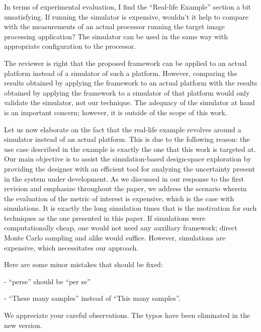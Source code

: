 \begin{reviewer}
In terms of experimental evaluation, I find the ``Real-life Example'' section a
bit unsatisfying. If running the simulator is expensive, wouldn't it help to
compare with the measurements of an actual processor running the target image
processing application? The simulator can be used in the same way with
appropriate configuration to the processor.
\end{reviewer}

\begin{authors}
The reviewer is right that the proposed framework can be applied to an actual
platform instead of a simulator of such a platform. However, comparing the
results obtained by applying the framework to an actual platform with the
results obtained by applying the framework to a simulator of that platform would
only validate the simulator, not our technique. The adequacy of the simulator at
hand is an important concern; however, it is outside of the scope of this work.

Let us now elaborate on the fact that the real-life example revolves around a
simulator instead of an actual platform. This is due to the following reason:
the use case described in the example is exactly the one that this work is
targeted at. Our main objective is to assist the simulation-based design-space
exploration by providing the designer with an efficient tool for analyzing the
uncertainty present in the system under development. As we discussed in our
response to the first revision and emphasize throughout the paper, we address
the scenario wherein the evaluation of the metric of interest is expensive,
which is the case with simulations. It is exactly the long simulation times that
is the motivation for such techniques as the one presented in this paper. If
simulations were computationally cheap, one would not need any auxiliary
framework; direct Monte Carlo sampling and alike would suffice. However,
simulations are expensive, which necessitates our approach.
\end{authors}

\begin{reviewer}
Here are some minor mistakes that should be fixed:

\noindent- ``perse'' should be ``per se''

\noindent- ``These many samples'' instead of ``This many samples''.
\end{reviewer}

\begin{authors}
We appreciate your careful observations. The typos have been eliminated in the
new version.

\begin{actions}
\end{actions}
\end{authors}
